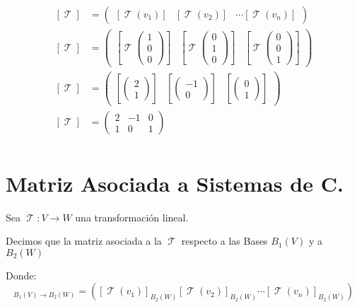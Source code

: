 \documentclass[12pt]{report}                                    %
\DeclareMathOperator \LinealTransformation {\mathcal{T}}        %
\DeclareMathOperator \LT {\mathcal{T}}                          %
\newcommand{\pVector}[1]{                                       %
        \ensuremath{\begin{pmatrix}#1\end{pmatrix}}                 %
    }
\begin{document}
                \begin{equation*}
                \begin{split}
                    [\LT]  &= \pVector{ [\LT(v_1)] & [\LT(v_2)] & \cdots [\LT(v_n)]}                            \\
                    [\LT]  &= \pVector{[\LT\pVector{1\\0\\0}]&[\LT\pVector{0\\1\\0}]&[\LT\pVector{0\\0\\1}]}    \\
                    [\LT]  &= \pVector{[\pVector{2\\1}]&[\pVector{-1\\0}]&[\pVector{0\\1}]}                     \\
                    [\LT]  &= \pVector{ 2 & -1 & 0 \\ 1 & 0 & 1  }                                              \\
                \end{split}
                \end{equation*}







    \clearpage
    \section{Matriz Asociada a Sistemas de C.}
        Sea $\LinealTransformation : V \to W $ una transformación lineal.
        
        Decimos que la matriz asociada a la $\LinealTransformation$ respecto a las Bases 
        $B_{1}(V)$ y a $B_{2}(W)$

        Donde:
        \begin{equation*}
            [\LinealTransformation]_{B_{1}(V) \to B_{2}(W)} = 
            \left(
                [\LinealTransformation(v_1)]_{B_{2}(W)}
                [\LinealTransformation(v_2)]_{B_{2}(W)}
                \cdots
                [\LinealTransformation(v_n)]_{B_{2}(W)}
            \right)
        \end{equation*}
\end{document}
